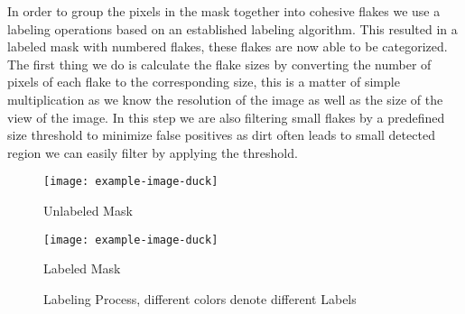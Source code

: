 In order to group the pixels in the mask together into cohesive flakes we use a labeling operations based on an established labeling algorithm\cite{labeler}. This resulted in a labeled mask with numbered flakes, these flakes are now able to be categorized. The first thing we do is calculate the flake sizes by converting the number of pixels of each flake to the corresponding size, this is a matter of simple multiplication as we know the resolution of the image as well as the size of the view of the image. In this step we are also filtering small flakes by a predefined size threshold to minimize false positives as dirt often leads to small detected region we can easily filter by applying the threshold.\\
\begin{figure}[h]
\centering
\begin{minipage}{.45\textwidth}
  \centering
  \texttt{[image: example-image-duck]}
  \caption{Unlabeled Mask}
\end{minipage}
\begin{minipage}{.45\textwidth}
  \centering
  \texttt{[image: example-image-duck]}
    \caption{Labeled Mask}
\end{minipage}
\caption{Labeling Process, different colors denote different Labels}
\end{figure}